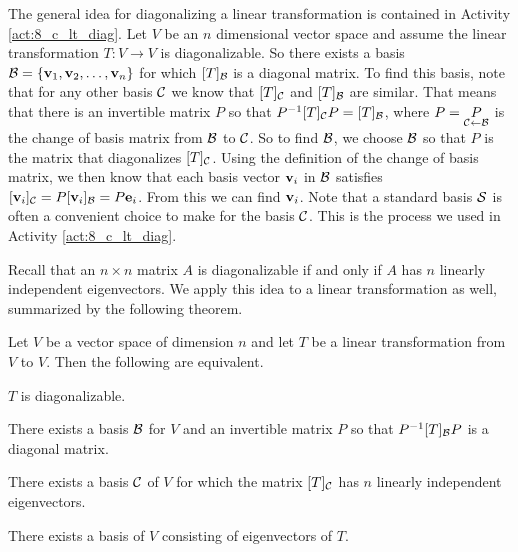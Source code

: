 The general idea for diagonalizing a linear transformation is contained in Activity \ref{act:8_c_lt_diag}. Let $V$ be an $n$ dimensional vector space and assume the linear transformation $T : V \to V$ is diagonalizable. So there exists a basis $\mathcal{B} = \{\mathbf{v}_1, \mathbf{v}_2, \ldots, \mathbf{v}_n\}$ for which $[T]_{\mathcal{B}}$ is a diagonal matrix. To find this basis, note that for any other basis $\mathcal{C}$ we know that $[T]_{\mathcal{C}}$ and $[T]_{\mathcal{B}}$ are similar. That means that there is an invertible matrix $P$ so that $P^{-1}[T]_{\mathcal{C}}P = [T]_{\mathcal{B}}$, where $P= \underset{\mathcal{C} \leftarrow \mathcal{B}}{P}$ is the change of basis matrix from $\mathcal{B}$ to $\mathcal{C}$. So to find $\mathcal{B}$, we choose $\mathcal{B}$ so that $P$ is the matrix that diagonalizes $[T]_{\mathcal{C}}$. Using the definition of the change of basis matrix, we then know that each basis vector $\mathbf{v}_i$ in $\mathcal{B}$ satisfies $[\mathbf{v}_i]_{\mathcal{C}}=P[\mathbf{v}_i]_{\mathcal{B}}= P \mathbf{e}_i$. From this we can find $\mathbf{v}_i$. Note that a standard basis $\mathcal{S}$ is often a convenient choice to make for the basis $\mathcal{C}$. This is the process we used in Activity \ref{act:8_c_lt_diag}.

Recall that an $n \times n$ matrix $A$ is diagonalizable if and only if $A$ has $n$ linearly independent eigenvectors. We apply this idea to a linear transformation as well, summarized by the following theorem. 

\begin{theorem} Let $V$ be a vector space of dimension $n$ and let $T$ be a linear transformation from $V$ to $V$. Then the following are equivalent.
	\be
	\item $T$ is diagonalizable. 
	\item There exists a basis $\mathcal{B}$ for $V$ and an invertible matrix $P$ so that $P^{-1}[T]_{\mathcal{B}}P$ is a diagonal matrix.
	\item There exists a basis $\mathcal{C}$ of $V$ for which the matrix $[T]_{\mathcal{C}}$ has $n$ linearly independent eigenvectors.
	\item There exists a basis of $V$ consisting of eigenvectors of $T$.
	\ee
\end{theorem}

\label{sec:eigen_trans_exam}

\ExampleIntro

